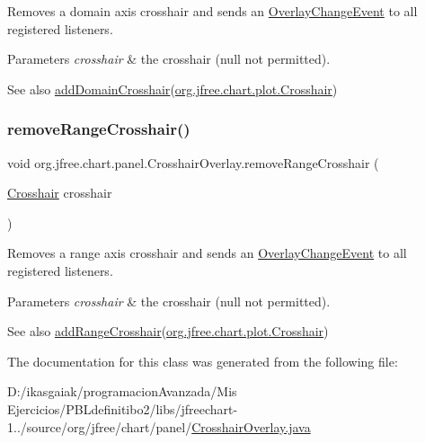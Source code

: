 Removes a domain axis crosshair and sends an \mbox{\hyperlink{}{Overlay\+Change\+Event}} to all registered listeners.


\begin{DoxyParams}{Parameters}
{\em crosshair} & the crosshair ({\ttfamily null} not permitted).\\
\hline
\end{DoxyParams}
\begin{DoxySeeAlso}{See also}
\mbox{\hyperlink{classorg_1_1jfree_1_1chart_1_1panel_1_1_crosshair_overlay_adebe4aa34a8545726d6dd708a6daf1d9}{add\+Domain\+Crosshair}}(\mbox{\hyperlink{classorg_1_1jfree_1_1chart_1_1plot_1_1_crosshair}{org.\+jfree.\+chart.\+plot.\+Crosshair}}) 
\end{DoxySeeAlso}
\mbox{\label{classorg_1_1jfree_1_1chart_1_1panel_1_1_crosshair_overlay_a89a21846fbabe76c99108646640530f9}} 
\subsubsection{\texorpdfstring{remove\+Range\+Crosshair()}{removeRangeCrosshair()}}
{\footnotesize\ttfamily void org.\+jfree.\+chart.\+panel.\+Crosshair\+Overlay.\+remove\+Range\+Crosshair (\begin{DoxyParamCaption}\item[{\mbox{\hyperlink{classorg_1_1jfree_1_1chart_1_1plot_1_1_crosshair}{Crosshair}}}]{crosshair }\end{DoxyParamCaption})}

Removes a range axis crosshair and sends an \mbox{\hyperlink{}{Overlay\+Change\+Event}} to all registered listeners.


\begin{DoxyParams}{Parameters}
{\em crosshair} & the crosshair ({\ttfamily null} not permitted).\\
\hline
\end{DoxyParams}
\begin{DoxySeeAlso}{See also}
\mbox{\hyperlink{classorg_1_1jfree_1_1chart_1_1panel_1_1_crosshair_overlay_a646be9e4b9ab7774b97949a0c9f475a9}{add\+Range\+Crosshair}}(\mbox{\hyperlink{classorg_1_1jfree_1_1chart_1_1plot_1_1_crosshair}{org.\+jfree.\+chart.\+plot.\+Crosshair}}) 
\end{DoxySeeAlso}


The documentation for this class was generated from the following file\+:\begin{DoxyCompactItemize}
\item 
D\+:/ikasgaiak/programacion\+Avanzada/\+Mis Ejercicios/\+P\+B\+Ldefinitibo2/libs/jfreechart-\/1../source/org/jfree/chart/panel/\mbox{\hyperlink{_crosshair_overlay_8java}{Crosshair\+Overlay.\+java}}\end{DoxyCompactItemize}
